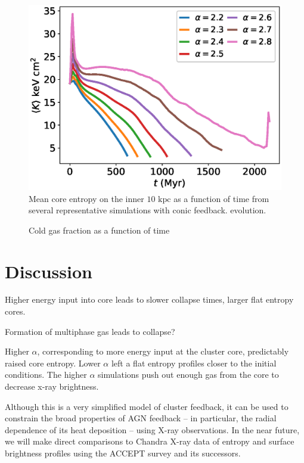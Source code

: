 \documentclass[iop,apjl, twocolappendix]{emulateapj}   %
\begin{document}
\begin{figure}
  \begin{center}
    \includegraphics[width=0.9\linewidth]{figures/conic/avgCoreEntropies.eps}
  \end{center}
  \caption{
    \label{fig:conicCoreEntropies}
    Mean core entropy on the inner $10 \text{ kpc}$ as
  a function of time from several representative simulations with conic feedback.  evolution.}
\end{figure}

\begin{figure}
  \caption{Cold gas fraction as a function of time}
\end{figure}



\section{Discussion}
\label{sec:discussion}

\textbullet Higher energy input into core leads to slower collapse times, larger flat entropy cores.

\textbullet Formation of multiphase gas leads to collapse?

Higher $\alpha$, corresponding to more energy input at the cluster core,
predictably raised core entropy. Lower $\alpha$ left a flat entropy
profiles closer to the initial conditions.  The higher $\alpha$
simulations push out enough gas from the core to decrease x-ray
brightness. 

Although this is a very simplified model of cluster feedback, it can be used to
constrain the broad properties of AGN feedback -- in particular, the radial
dependence of its heat deposition -- using X-ray observations.  In the near
future, we will make direct comparisons to Chandra X-ray data of entropy and
surface brightness profiles  using the ACCEPT survey
\cite{cavagnolo_intracluster_2009} and its successors.
\end{document}
